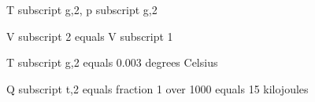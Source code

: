T subscript g,2, p subscript g,2

V subscript 2 equals V subscript 1

T subscript g,2 equals 0.003 degrees Celsius

Q subscript t,2 equals fraction 1 over 1000 equals 15 kilojoules